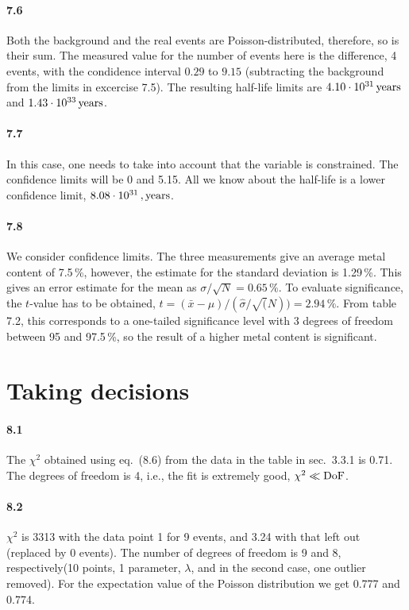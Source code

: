 \documentclass[a4paper,12pt]{article}
\begin{document}
\paragraph{7.6} Both the background and the real events are Poisson-distributed, therefore, so is their sum. The measured value for the number of events here is the difference, 4 events, with the condidence interval $0.29$ to $9.15$ (subtracting the background from the limits in excercise 7.5). The resulting half-life limits are $4.10\cdot 10^{31}\,{\rm years}$ and $1.43\cdot 10^{33}\,{\rm years}$.

\paragraph{7.7} In this case, one needs to take into account that the variable is constrained. The confidence limits will be 0 and 5.15. All we know about the half-life is a lower confidence limit, $8.08\cdot 10^{31}\,,{\rm years}$.

\paragraph{7.8} We consider confidence limits. The three measurements give an average metal content of 7.5\,\%, however, the estimate for the standard deviation is 1.29\,\%. This gives an error estimate for the mean as $\sigma/\sqrt{N} = 0.65\,\%$. To evaluate significance, the $t$-value has to be obtained, $t=(\bar{x}-\mu)/(\hat{\sigma}/\sqrt(N)) = 2.94\,\%$. From table 7.2, this corresponds to a one-tailed significance level with 3 degrees of freedom between 95 and 97.5\,\%, so the result of a higher metal content is significant.


\section{Taking decisions}

\paragraph{8.1} The $\chi^2$ obtained using eq.\ (8.6) from the data in the table in sec.\ 3.3.1 is 0.71. The degrees of freedom is 4, i.e., the fit is extremely good, $\chi^2 \ll {\rm DoF}$.

\paragraph{8.2} $\chi^2$ is 3313 with the data point 1 for 9 events, and 3.24 with that left out (replaced by 0 events). The number of degrees of freedom is 9 and 8, respectively(10 points, 1 parameter, $\lambda$, and in the second case, one outlier removed). For the expectation value of the Poisson distribution we get 0.777 and 0.774.
\end{document}
